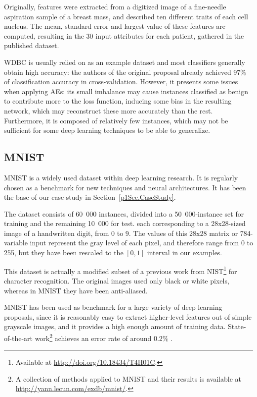 Originally, features were extracted from a digitized image of a fine-needle aspiration sample of a breast mass, and described ten different traits of each cell nucleus. The mean, standard error and largest value of these features are computed, resulting in the 30 input attributes for each patient, gathered in the published dataset.

WDBC is usually relied on as an example dataset and most classifiers generally obtain high accuracy: the authors of the original proposal already achieved 97\% of classification accuracy in cross-validation. However, it presents some issues when applying AEs: its small imbalance may cause instances classified as benign to contribute more to the loss function, inducing some bias in the resulting network, which may reconstruct these more accurately than the rest. Furthermore, it is composed of relatively few instances, which may not be sufficient for some deep learning techniques to be able to generalize.

\subsection{MNIST}

MNIST  is a widely used dataset within deep learning research. It is regularly chosen as a benchmark for new techniques and neural architectures. It has been the base of our case study in Section~\ref{p1Sec.CaseStudy}.

The dataset consists of 60~000 instances, divided into a 50~000-instance set for training and the remaining 10~000 for test. each corresponding to a 28x28-sized image of a handwritten digit, from 0 to 9. The values of this 28x28 matrix or 784-variable input represent the gray level of each pixel, and therefore range from 0 to 255, but they have been rescaled to the $[0,1]$ interval in our examples.

This dataset is actually a modified subset of a previous work from NIST\footnote{Available at \url{http://doi.org/10.18434/T4H01C}.} for character recognition. The original images used only black or white pixels, whereas in MNIST they have been anti-aliased.

MNIST has been used as benchmark for a large variety of deep learning proposals, since it is reasonably easy to extract higher-level features out of simple grayscale images, and it provides a high enough amount of training data. State-of-the-art work\footnote{A collection of methods applied to MNIST and their results is available at \url{http://yann.lecun.com/exdb/mnist/}.} achieves an error rate of around 0.2\% .
